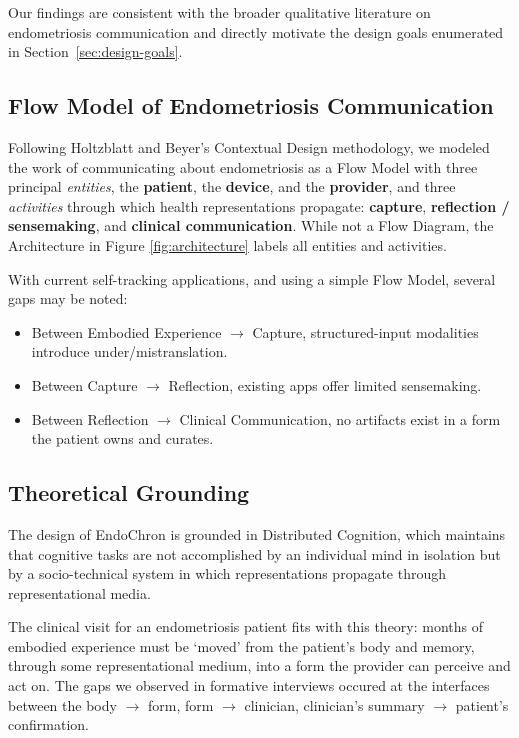 Our findings are consistent with the broader qualitative literature on endometriosis communication\cite{Pichon2021Divided,Pichon2025Betrayal,Mardon2023EndometriosisReview} and directly motivate the design goals enumerated in Section~\ref{sec:design-goals}.

\subsection{Flow Model of Endometriosis Communication}

Following Holtzblatt and Beyer's Contextual Design methodology\cite{Beyer1997ContextualDesign}, we modeled the work of communicating about endometriosis as a Flow Model with three principal \textit{entities}, the \textbf{patient}, the \textbf{device}, and the \textbf{provider}, and three \textit{activities} through which health representations propagate: \textbf{capture}, \textbf{reflection / sensemaking}, and \textbf{clinical communication}. While not a Flow Diagram, the Architecture in Figure \ref{fig:architecture} labels all entities and activities.

With current self-tracking applications, and using a simple Flow Model, several gaps may be noted:

\begin{itemize}
  \item Between Embodied Experience $\rightarrow$ Capture, structured-input modalities introduce under/mistranslation.
  \item Between Capture $\rightarrow$ Reflection, existing apps offer limited sensemaking.
  \item Between Reflection $\rightarrow$ Clinical Communication, no artifacts exist in a form the patient owns and curates.
\end{itemize}

\subsection{Theoretical Grounding}

The design of EndoChron is grounded in Distributed Cognition, which maintains that cognitive tasks are not accomplished by an individual mind in isolation but by a socio-technical system in which representations propagate through representational media\cite{furniss2019sociotechnical}.

The clinical visit for an endometriosis patient fits with this theory: months of embodied experience must be `moved' from the patient's body and memory, through some representational medium, into a form the provider can perceive and act on. The gaps we observed in formative interviews occured at the interfaces between the body $\rightarrow$ form, form $\rightarrow$ clinician, clinician's summary $\rightarrow$ patient's confirmation.

